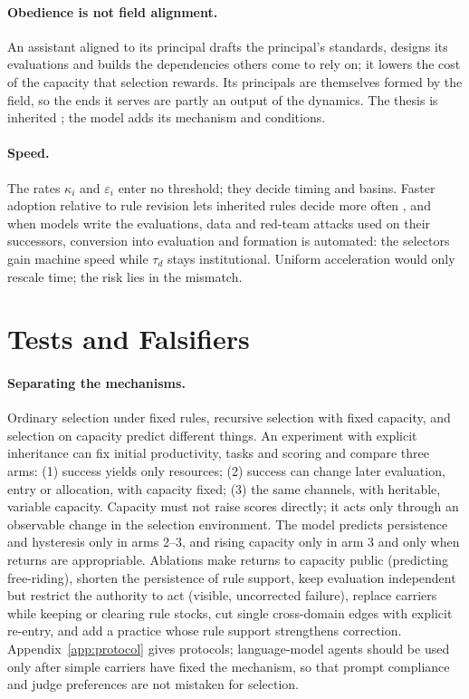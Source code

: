 \documentclass[letterpaper]{article} %
\theoremstyle{definition}
\begin{document}
\paragraph{Obedience is not field alignment.} An assistant aligned to its principal drafts the principal's standards, designs its evaluations and builds the dependencies others come to rely on; it lowers the cost of the capacity that selection rewards. Its principals are themselves formed by the field, so the ends it serves are partly an output of the dynamics. The thesis is inherited \citep{critch2020,critch2021,kulveit2025}; the model adds its mechanism and conditions.

\paragraph{Speed.} The rates $\kappa_i$ and $\varepsilon_i$ enter no threshold; they decide timing and basins. Faster adoption relative to rule revision lets inherited rules decide more often \citep{marchant2011}, and when models write the evaluations, data and red-team attacks used on their successors, conversion into evaluation and formation is automated: the selectors gain machine speed while $\tau_d$ stays institutional. Uniform acceleration would only rescale time; the risk lies in the mismatch.

\section{Tests and Falsifiers}\label{sec:tests}

\paragraph{Separating the mechanisms.} Ordinary selection under fixed rules, recursive selection with fixed capacity, and selection on capacity predict different things. An experiment with explicit inheritance can fix initial productivity, tasks and scoring and compare three arms: (1) success yields only resources; (2) success can change later evaluation, entry or allocation, with capacity fixed; (3) the same channels, with heritable, variable capacity. Capacity must not raise scores directly; it acts only through an observable change in the selection environment. The model predicts persistence and hysteresis only in arms 2--3, and rising capacity only in arm 3 and only when returns are appropriable. Ablations make returns to capacity public (predicting free-riding), shorten the persistence of rule support, keep evaluation independent but restrict the authority to act (visible, uncorrected failure), replace carriers while keeping or clearing rule stocks, cut single cross-domain edges with explicit re-entry, and add a practice whose rule support strengthens correction. Appendix~\ref{app:protocol} gives protocols; language-model agents should be used only after simple carriers have fixed the mechanism, so that prompt compliance and judge preferences are not mistaken for selection.
\end{document}
